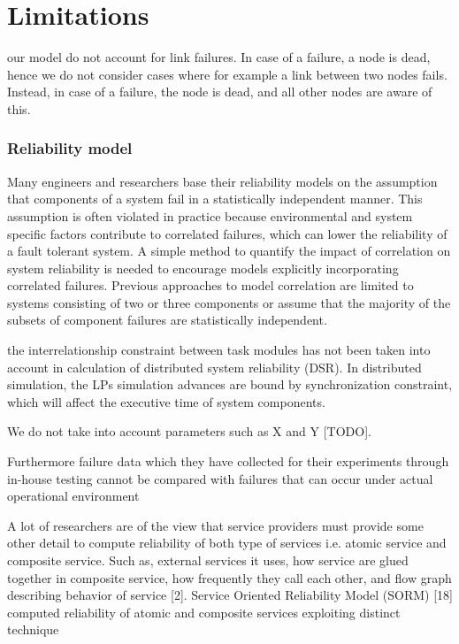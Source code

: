 \documentclass{cslthse-msc}
\begin{document}
\chapter{Limitations} \label{ch:limitations}

our model do not account for link failures. In case of a failure, a node is dead, hence we do not consider cases where for example a link between two nodes fails. Instead, in case of a failure, the node is dead, and all other nodes are aware of this.

\subsection{Reliability model}
\label{sec:limitations_reliability_model}
Many engineers and researchers base their reliability models on the assumption that components of a system fail in a statistically independent manner. This assumption is often violated in practice because environmental and system specific factors contribute to correlated failures, which can lower the reliability of a fault tolerant system. A simple method to quantify the impact of correlation on system reliability is needed to encourage models explicitly incorporating correlated failures. Previous approaches to model correlation are limited to systems consisting of two or three components or assume that the majority of the subsets of component failures are statistically independent. \cite{discContRelModel}


the interrelationship constraint between task modules has not been taken into account in calculation of distributed system reliability (DSR). In distributed simulation, the LPs simulation advances are bound by synchronization constraint, which will affect the executive time of system components. \cite{relModelDistSimSystem}

We do not take into account parameters such as X and Y [TODO].

Furthermore failure data which they have collected for their experiments through in-house testing cannot be compared with failures that can occur under actual operational environment \cite{surveyReliabilityDistr}

A lot of researchers are of the view that service providers must provide some other detail to compute reliability of both type of services i.e. atomic service and composite service. Such as, external services it uses, how service are glued together in composite service, how frequently they call each other, and flow graph describing behavior of service [2]. Service Oriented Reliability Model (SORM) [18] computed reliability of atomic and composite services exploiting distinct technique \cite{surveyReliabilityDistr}
\end{document}
